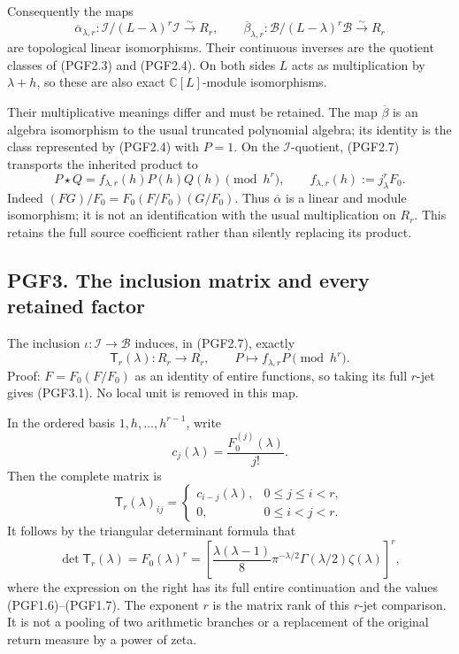 Consequently the maps \[
\overline\alpha_{\lambda,r}:
\mathcal I/(L-\lambda)^r\mathcal I\xrightarrow{\sim}R_r,
\qquad
\overline\beta_{\lambda,r}:
\mathcal B/(L-\lambda)^r\mathcal B\xrightarrow{\sim}R_r
\tag{PGF2.7}
\] are topological linear isomorphisms. Their continuous inverses are
the quotient classes of (PGF2.3) and (PGF2.4). On both sides \(L\) acts
as multiplication by \(\lambda+h\), so these are also exact
\(\mathbb C[L]\)-module isomorphisms.

Their multiplicative meanings differ and must be retained. The map
\(\overline\beta\) is an algebra isomorphism to the usual truncated
polynomial algebra; its identity is the class represented by (PGF2.4)
with \(P=1\). On the \(\mathcal I\)-quotient, (PGF2.7) transports the
inherited product to \[
P\star Q=f_{\lambda,r}(h)P(h)Q(h)\pmod{h^r},
\qquad
f_{\lambda,r}(h):=j^r_\lambda F_0.
\tag{PGF2.8}
\] Indeed \((FG)/F_0=F_0(F/F_0)(G/F_0)\). Thus \(\overline\alpha\) is a
linear and module isomorphism; it is not an identification with the
usual multiplication on \(R_r\). This retains the full source
coefficient rather than silently replacing its product.

\subsection{PGF3. The inclusion matrix and every retained
factor}\label{pgf3.-the-inclusion-matrix-and-every-retained-factor}

The inclusion \(\iota:\mathcal I\to\mathcal B\) induces, in (PGF2.7),
exactly \[
\mathsf T_r(\lambda):R_r\longrightarrow R_r,
\qquad P\longmapsto f_{\lambda,r}P\pmod{h^r}.
\tag{PGF3.1}
\] Proof: \(F=F_0(F/F_0)\) as an identity of entire functions, so taking
its full \(r\)-jet gives (PGF3.1). No local unit is removed in this map.

In the ordered basis \(1,h,\ldots,h^{r-1}\), write \[
c_j(\lambda)=\frac{F_0^{(j)}(\lambda)}{j!}.
\tag{PGF3.2}
\] Then the complete matrix is \[
\mathsf T_r(\lambda)_{ij}=
\begin{cases}
c_{i-j}(\lambda),&0\le j\le i<r,\\
0,&0\le i<j<r.
\end{cases}
\tag{PGF3.3}
\] It follows by the triangular determinant formula that \[
\det\mathsf T_r(\lambda)=F_0(\lambda)^r
=\left[\frac{\lambda(\lambda-1)}8\pi^{-\lambda/2}
\Gamma(\lambda/2)\zeta(\lambda)\right]^r,
\tag{PGF3.4}
\] where the expression on the right has its full entire continuation
and the values (PGF1.6)--(PGF1.7). The exponent \(r\) is the matrix rank
of this \(r\)-jet comparison. It is not a pooling of two arithmetic
branches or a replacement of the original return measure by a power of
zeta.

